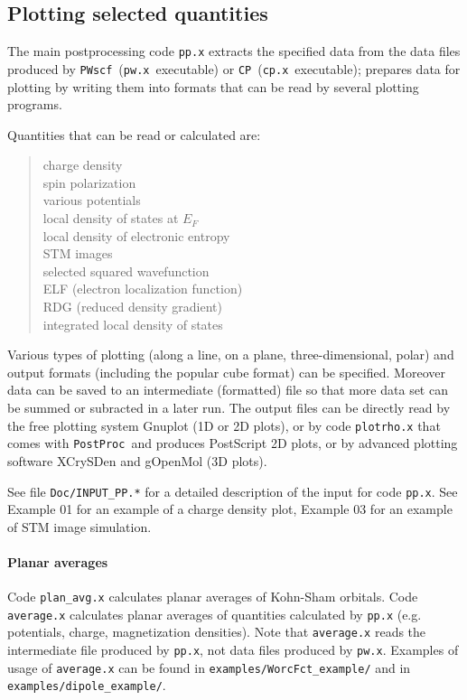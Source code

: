 \documentclass[12pt,a4paper]{article}
\def\pwx{\texttt{pw.x}}
\def\cpx{\texttt{cp.x}}
\def\PWscf{\texttt{PWscf}}
\def\CP{\texttt{CP}}
\def\PostProc{\texttt{PostProc}}
\begin{document}
\subsection{Plotting selected quantities}
  
The main postprocessing code \texttt{pp.x} extracts the specified data
from the data files produced by \PWscf\ (\pwx\ executable) or \CP\ 
(\cpx\ executable); prepares data for plotting by writing them into 
formats that can be read by several plotting programs.

Quantities that can be read or calculated are:
\begin{quote}
      charge density\\
      spin polarization\\
      various potentials\\
      local density of states at $E_F$\\
      local density of electronic entropy\\
      STM images\\
      selected squared wavefunction\\
      ELF (electron localization function)\\
      RDG (reduced density gradient)\\
      integrated local density of states
\end{quote}
Various types of plotting (along a line, on a plane, three-dimensional, polar)
and output formats (including the popular cube format) can be specified.
Moreover data can be saved to an intermediate (formatted) file so that
more data set can be summed or subracted in a later run.
The output files can be directly read by the free plotting system Gnuplot
(1D or 2D plots), or by code \texttt{plotrho.x} that comes with \PostProc\ 
and produces PostScript 2D plots,
or by advanced plotting software XCrySDen and gOpenMol (3D plots).

See file \texttt{Doc/INPUT\_PP.*} for a detailed description of the input
for code \texttt{pp.x}.
See Example 01 for an example of a charge density plot, Example 03
for an example of STM image simulation.

\paragraph{Planar averages}
Code \texttt{plan\_avg.x} calculates planar averages of Kohn-Sham orbitals.
Code \texttt{average.x} calculates planar averages of quantities calculated
by \texttt{pp.x} (e.g. potentials, charge, magnetization densities).
Note that \texttt{average.x} reads the intermediate file produced
by \texttt{pp.x}, not data files produced by \pwx. Examples of usage 
of \texttt{average.x} can be found in \texttt{examples/WorcFct\_example/} 
and in \texttt{examples/dipole\_example/}.
\end{document}
